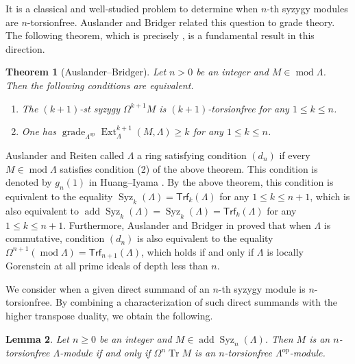 \documentclass{amsart}
\newtheorem{thm}{Theorem}[section]
\newtheorem{lem}[thm]{Lemma}
\theoremstyle{definition}
\theoremstyle{remark}
\numberwithin{equation}{thm}
\def\add{\operatorname{add}}
\def\Ext{\operatorname{Ext}}
\def\ge{\geqslant}
\def\grade{\operatorname{grade}}
\def\le{\leqslant}
\def\mod{\operatorname{mod}}
\def\syz{\Omega}
\def\Syz{\operatorname{Syz}}
\def\Trf{\mathsf{Trf}}
\def\tr{\operatorname{Tr}}
\begin{document}
It is a classical and well-studied problem to determine when $n$-th syzygy modules are $n$-torsionfree.
Auslander and Bridger related this question to grade theory.
The following theorem, which is precisely \cite[Proposition 2.26]{AB}, is a fundamental result in this direction.

\begin{thm}[Auslander--Bridger]\label{EGABclass}
Let $n > 0$ be an integer and $M\in\mod\Lambda$.  
Then the following conditions are equivalent.
\begin{enumerate}
   \item The $(k+1)$-st syzygy $\syz^{k+1} M$ is $(k+1)$-torsionfree for any $1\le k\le n$.
   \item One has $\grade_{\Lambda^{\mathrm{op}}}\Ext^{k+1}_\Lambda(M,\Lambda)\ge k$ for any $1\le k\le n$.
\end{enumerate}
\end{thm}

Auslander and Reiten \cite{AR1} called $\Lambda$ a ring satisfying condition $(d_n)$ if every $M\in\mod\Lambda$ satisfies condition (2) of the above theorem. This condition is denoted by $g_n(1)$ in Huang--Iyama \cite{HI}. By the above theorem, this condition is equivalent to the equality $\Syz_k(\Lambda)=\Trf_k(\Lambda)$ for any $1\le k\le n+1$, which is also equivalent to $\add\Syz_k(\Lambda)=\Syz_k(\Lambda)=\Trf_k(\Lambda)$ for any $1\le k\le n+1$.
Furthermore, Auslander and Bridger in \cite[Proposition 4.21]{AB} proved that when $\Lambda$ is commutative, condition $(d_n)$ is also equivalent to the equality $\syz^{n+1}(\mod\Lambda)=\Trf_{n+1}(\Lambda)$, which holds if and only if $\Lambda$ is locally Gorenstein at all prime ideals of depth less than $n$.


We consider when a given direct summand of an $n$-th syzygy module is $n$-torsionfree. By combining a characterization of such direct summands with the higher transpose duality, we obtain the following.

\begin{lem}\label{highABlem}
Let $n\ge0$ be an integer and $M\in\add\Syz_n(\Lambda)$. Then $M$ is an $n$-torsionfree $\Lambda$-module if and only if $\syz^n\tr M$ is an $n$-torsionfree $\Lambda^{\mathrm{op}}$-module.
\end{lem}
\end{document}
